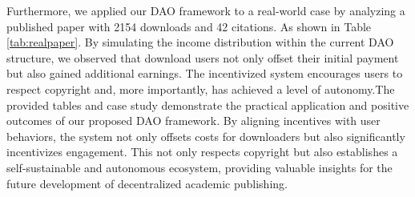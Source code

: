 \documentclass[lettersize,journal]{IEEEtran}
\begin{document}
Furthermore, we applied our DAO framework to a real-world case by analyzing a published paper with 2154 downloads and 42 citations. As shown in Table \ref{tab:realpaper}. By simulating the income distribution within the current DAO structure, we observed that download users not only offset their initial payment but also gained additional earnings. The incentivized system encourages users to respect copyright and, more importantly, has achieved a level of autonomy.The provided tables and case study demonstrate the practical application and positive outcomes of our proposed DAO framework. By aligning incentives with user behaviors, the system not only offsets costs for downloaders but also significantly incentivizes engagement. This not only respects copyright but also establishes a self-sustainable and autonomous ecosystem, providing valuable insights for the future development of decentralized academic publishing.

\end{document}
